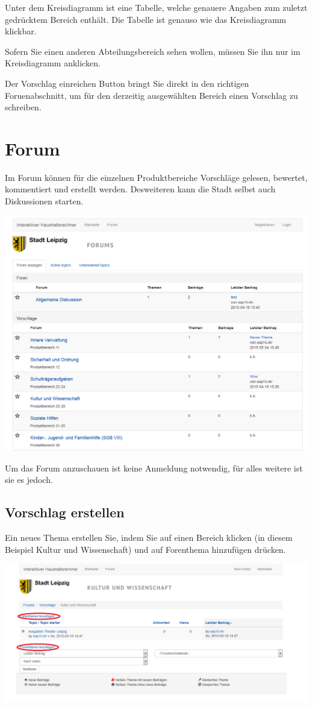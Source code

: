 \documentclass[a4paper,11pt,twoside]{article}
\begin{document}
Unter dem Kreisdiagramm ist eine Tabelle, welche genauere Angaben zum zuletzt
gedr\"ucktem Bereich enth\"alt. Die Tabelle ist genauso wie das Kreisdiagramm
klickbar.

Sofern Sie einen anderen Abteilungsbereich sehen wollen, m\"ussen Sie ihn nur
im Kreisdiagramm anklicken.

Der Vorschlag einreichen Button bringt Sie direkt in den richtigen
Foruenabschnitt, um f\"ur den derzeitig ausgew\"ahlten Bereich einen Vorschlag
zu schreiben.

\section{Forum}
Im Forum k\"onnen f\"ur die einzelnen Produktbereiche Vorschl\"age gelesen,
bewertet, kommentiert und erstellt werden. Desweiteren kann die Stadt selbst
auch Diskussionen starten.

\begin{center}
  \includegraphics[width=\textwidth]{Bilder/forum.png}
\end{center}
Um das Forum anzuschauen ist keine Anmeldung notwendig, f\"ur alles weitere
ist sie es jedoch.
\subsection{Vorschlag erstellen}
Ein neues Thema erstellen Sie, indem Sie auf einen Bereich klicken (in diesem
Beispiel Kultur und Wissenschaft) und auf Forenthema hinzuf\"ugen dr\"ucken.

\begin{center}
  \includegraphics[width=\textwidth]{Bilder/forumtopic.png}
\end{center}
\end{document}
